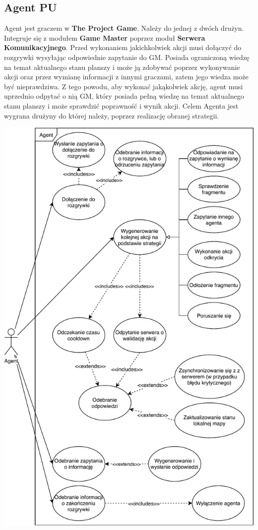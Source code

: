 \documentclass[../Dokumentacja.tex]{subfiles}
\begin{document}
\subsection{Agent PU}
Agent jest graczem w \textbf{The Project Game}. Należy do jednej z dwóch drużyn. Integruje się z modułem \textbf{Game Master} poprzez moduł \textbf{Serwera Komunikacyjnego}. Przed wykonaniem jakichkolwiek akcji musi dołączyć do rozgrywki wysyłając odpowiednie zapytanie do GM. Posiada ograniczoną wiedzę na temat aktualnego stanu planszy i może ją zdobywać poprzez wykonywanie akcji oraz przez wymianę informacji z innymi graczami, zatem jego wiedza może być nieprawdziwa. Z tego powodu, aby wykonać jakąkolwiek akcję, agent musi uprzednio odpytać o nią GM, który posiada pełną wiedzę na temat aktualnego stanu planszy i może sprawdzić poprawność i wynik akcji. Celem Agenta jest wygrana drużyny do której należy, poprzez realizację obranej strategii.

\includegraphics[width=\textwidth]{resources/Agent-Agent.pdf}
\end{document}
